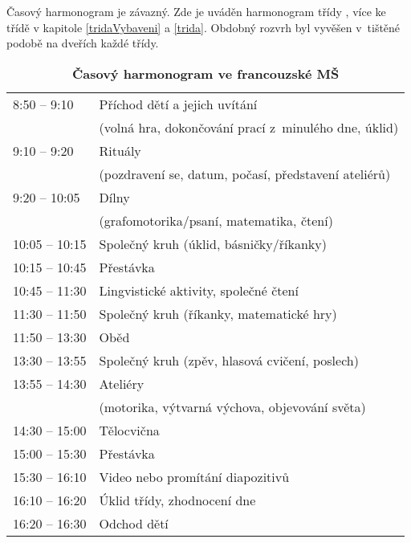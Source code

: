 			Časový harmonogram je závazný. Zde je uváděn harmonogram třídy , více ke třídě v kapitole \ref{tridaVybaveni} a \ref{trida}. Obdobný rozvrh byl vyvěšen v tištěné podobě na dveřích každé třídy. 

\begin{spacing}{1.0}
	\begin{table}[h!]
		\center
		\begin{tabular}{|l l|}
			\hline
			\rowcolor{grey!0}
			8:50 – 9:10 		& Příchod dětí a jejich uvítání 						\\
								& (volná hra, dokončování prací z minulého dne, úklid) 	\\
			9:10 – 9:20			& Rituály 												\\
								& (pozdravení se, datum, počasí, představení ateliérů) 	\\
			9:20 – 10:05		& Dílny 												\\
								& (grafomotorika/psaní, matematika, čtení) 				\\
			10:05 – 10:15		& Společný kruh (úklid, básničky/říkanky) 				\\
			10:15 – 10:45		& Přestávka 											\\
			10:45 – 11:30		& Lingvistické aktivity, společné čtení 				\\
			11:30 – 11:50		& Společný kruh (říkanky, matematické hry) 				\\
			11:50 – 13:30		& Oběd 													\\
			13:30 – 13:55		& Společný kruh (zpěv, hlasová cvičení, poslech) 		\\
			13:55 – 14:30		& Ateliéry 												\\
								&(motorika, výtvarná výchova, objevování světa) 		\\
			14:30 – 15:00		& Tělocvična 											\\
			15:00 – 15:30		& Přestávka 											\\
			15:30 – 16:10		& Video nebo promítání diapozitivů 						\\
			16:10 – 16:20		& Úklid třídy, zhodnocení dne 							\\
			16:20 – 16:30		& Odchod dětí 											\\
			\hline
		\end{tabular}
		\caption{ \textbf{Časový harmonogram ve francouzské MŠ}	
		}
		\label{tab:rezimDneFR}
	\end{table}
	\end{spacing}

